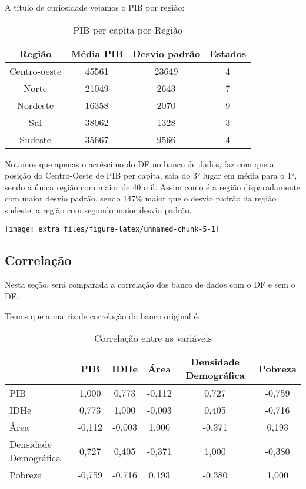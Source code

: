 \documentclass[
]{article}
\begin{document}
A título de curiosidade vejamos o PIB por região:

\begin{table}[H]

\caption{\label{tab:unnamed-chunk-4}PIB per capita por Região}
\centering
\begin{tabular}[t]{c|c|c|c}
\hline
Região & Média PIB & Desvio padrão & Estados\\
\hline
Centro-oeste & 45561 & 23649 & 4\\
\hline
Norte & 21049 & 2643 & 7\\
\hline
Nordeste & 16358 & 2070 & 9\\
\hline
Sul & 38062 & 1328 & 3\\
\hline
Sudeste & 35667 & 9566 & 4\\
\hline
\end{tabular}
\end{table}

Notamos que apenas o acréscimo do DF no banco de dados, faz com que a posição do Centro-Oeste de PIB per capita, saia do 3° lugar em média para o 1°, sendo a única região com maior de 40 mil. Assim como é a região disparadamente com maior desvio padrão, sendo 147\% maior que o desvio padrão da região sudeste, a região com segundo maior desvio padrão.

\begin{center}\texttt{[image: extra\_files/figure-latex/unnamed-chunk-5-1]} \end{center}

\subsection{Correlação}

Nesta seção, será comparada a correlação dos banco de dados com o DF e sem o DF.

Temos que a matriz de correlação do banco original é:

\begin{table}[H]

\caption{\label{tab:unnamed-chunk-6}Correlação entre as variáveis}
\centering
\begin{tabular}[t]{l|c|c|c|c|c}
\hline
  & PIB & IDHe & Área & Densidade Demográfica & Pobreza\\
\hline
PIB & 1,000 & 0,773 & -0,112 & 0,727 & -0,759\\
\hline
IDHe & 0,773 & 1,000 & -0,003 & 0,405 & -0,716\\
\hline
Área & -0,112 & -0,003 & 1,000 & -0,371 & 0,193\\
\hline
Densidade Demográfica & 0,727 & 0,405 & -0,371 & 1,000 & -0,380\\
\hline
Pobreza & -0,759 & -0,716 & 0,193 & -0,380 & 1,000\\
\hline
\end{tabular}
\end{table}
\end{document}
